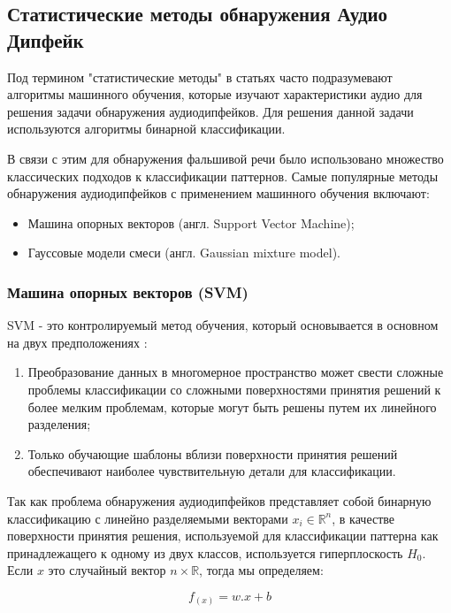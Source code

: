 \subsection{Статистические методы обнаружения Аудио Дипфейк}

Под термином "статистические методы" в статьях часто подразумевают алгоритмы машинного обучения, которые изучают характеристики аудио для решения задачи обнаружения аудиодипфейков. Для решения данной задачи используются алгоритмы бинарной классификации.

В связи с этим для обнаружения фальшивой речи было использовано множество классических подходов к классификации паттернов. Самые популярные методы обнаружения аудиодипфейков с применением машинного обучения включают:

\begin{itemize}
    \item Машина опорных векторов (англ. Support Vector Machine);
    \item Гауссовые модели смеси (англ. Gaussian mixture model).
\end{itemize}

\subsubsection{Машина опорных векторов (SVM)}

SVM - это контролируемый метод обучения, который основывается в основном на двух предположениях \cite{hamza2022deepfake}:
\begin{enumerate}
    \item Преобразование данных в многомерное пространство может свести сложные проблемы классификации со сложными поверхностями принятия решений к более мелким проблемам, которые могут быть решены путем их линейного разделения;
    \item Только обучающие шаблоны вблизи поверхности принятия решений обеспечивают наиболее чувствительную детали для классификации.
\end{enumerate}

Так как проблема обнаружения аудиодипфейков представляет собой бинарную классификацию с линейно разделяемыми векторами \(x_{i} \in \mathbb{R}^{n}\), в качестве поверхности принятия решения, используемой для классификации паттерна как принадлежащего к одному из двух классов, используется гиперплоскость \(H_{0}\). Если \(x\) это случайный вектор \(n \times \mathbb{R}\), тогда мы определяем:

\begin{equation}
    f_{(x)} = w.x + b
\end{equation}

